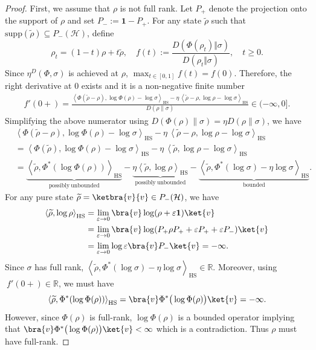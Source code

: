 \documentclass[11pt,reqno]{amsart}
\numberwithin{equation}{section}
\newcommand{\mb}{\mathbb}
\newcommand{\wt}{\widetilde}
\newcommand{\mc}{\mathcal}
\newcommand{\HS}[2]{\left\langle #1,#2\right\rangle_{\mathrm{HS}}} %
\begin{document}
\begin{proof}
First, we assume that $\rho$ is not full rank. Let $P_+$ denote the projection onto the support of $\rho$ and set $P_-:= \textbf{1} - P_+$. For any state $\wt \rho$ such that $\mathrm{supp}(\wt \rho) \subseteq P_-(\mc H)$, define 
\begin{equation}\label{eqn:ratio with time}
    \rho_t = (1-t)\rho + t \wt \rho, \quad f(t):=\frac{D(\Phi(\rho_{t})\Vert\sigma)}
                {D(\rho_{t}\Vert\sigma)},\quad t \ge 0.
\end{equation}
Since $\eta^D(\Phi,\sigma)$ is achieved at $\rho$, $\max_{t \in [0,1]}f(t) = f(0)$. Therefore, the right derivative at $0$ exists and it is a non-negative finite number
\begin{align*}
     f'(0+) = \frac{\HS{\Phi(\wt \rho - \rho)}{\log \Phi(\rho) - \log \sigma}-\eta\, \HS{\wt \rho - \rho}{\log \rho - \log \sigma}}{D(\rho \|\sigma)} \in (-\infty,0].
\end{align*}
Simplifying the above numerator using $D(\Phi(\rho)\|\sigma) = \eta D(\rho \|\sigma)$, we have 
\begin{align*}
    & \HS{\Phi(\wt \rho - \rho)}{\log \Phi(\rho) - \log \sigma}-\eta\, \HS{\wt \rho - \rho}{\log \rho - \log \sigma} \\
    & = \HS{\Phi(\wt \rho)}{\log \Phi(\rho) - \log \sigma}-\eta\, \HS{\wt \rho}{\log \rho - \log \sigma} \\
    & = \underbrace{\HS{\wt \rho}{\Phi^*(\log \Phi(\rho))}}_{\mathrm{possibly \ unbounded}} - \underbrace{\eta \HS{\wt \rho}{\log \rho}}_{\mathrm{possibly \ unbounded}} - \underbrace{\HS{\wt \rho}{\Phi^*(\log \sigma) - \eta \log \sigma}}_{\mathrm{bounded}}.
\end{align*}
For any pure state $\wt \rho = \ketbra{v}{v} \in P_-(\mc H)$, we have 
\begin{align*}
    \HS{\wt \rho}{\log \rho} & = \lim_{\varepsilon \to 0}\bra{v} \log (\rho + \varepsilon \textbf{1}) \ket{v} \\
    & =  \lim_{\varepsilon \to 0}\bra{v} \log (P_+ \rho P_+ + \varepsilon P_+ + \varepsilon P_-) \ket{v} \\
    & = \lim_{\varepsilon \to 0} \log \varepsilon \bra{v} P_- \ket{v} = -\infty.
\end{align*}
Since $\sigma$ has full rank, $\HS{\wt \rho}{\Phi^*(\log \sigma) - \eta \log \sigma}\in \mb R$. Moreover, using $\ f'(0+)\in \mb R$, we must have 
\begin{equation}\label{eqn:key-eqn minus infinity}
    \HS{\wt \rho}{\Phi^*(\log \Phi(\rho))} = \bra{v} \Phi^*\big( \log \Phi(\rho) \big) \ket{v} = -\infty.
\end{equation}
However, since $\Phi(\rho)$ is full-rank, $ \log \Phi(\rho)$ is a bounded operator implying that $\bra{v} \Phi^*\big( \log \Phi(\rho) \big) \ket{v} < \infty$ which is a contradiction. Thus $\rho$ must have full-rank.


\end{proof}
\end{document}
